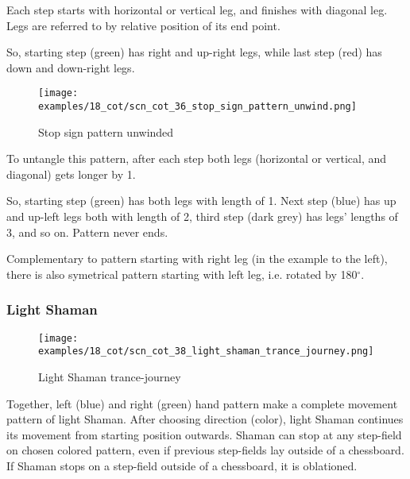 Each step starts with horizontal or vertical leg, and finishes with diagonal
leg. Legs are referred to by relative position of its end point.

So, starting step (green) has right and up-right legs, while last step (red)
has down and down-right legs.

\clearpage %

\noindent
\begin{wrapfigure}{l}{0.4\textwidth} %
\centering
\texttt{[image: examples/18\_cot/scn\_cot\_36\_stop\_sign\_pattern\_unwind.png]}
\caption{Stop sign pattern unwinded}
\label{fig:scn_cot_36_stop_sign_pattern_unwind}
\end{wrapfigure}
To untangle this pattern, after each step both legs (horizontal or vertical,
and diagonal) gets longer by 1.

So, starting step (green) has both legs with length of 1. Next step (blue)
has up and up-left legs both with length of 2, third step (dark grey) has
legs' lengths of 3, and so on. Pattern never ends.

Complementary to pattern starting with right leg (in the example to the
left), there is also symetrical pattern starting with left leg, i.e.
rotated by 180$^{\circ}$. %

\clearpage %

\subsubsection*{Light Shaman}
\label{sec:Conquest of Tlalocan/Trance-journey/Movement/Light Shaman}

\vspace*{-1.4\baselineskip}
\noindent
\begin{figure}[!h]
\texttt{[image: examples/18\_cot/scn\_cot\_38\_light\_shaman\_trance\_journey.png]}
\caption{Light Shaman trance-journey}
\label{fig:scn_cot_38_light_shaman_trance_journey}
\end{figure}

Together, left (blue) and right (green) hand pattern make a complete movement
pattern of light Shaman. After choosing direction (color), light Shaman
continues its movement from starting position outwards. Shaman can stop at
any step-field on chosen colored pattern, even if previous step-fields lay
outside of a chessboard. If Shaman stops on a step-field outside of a
chessboard, it is oblationed.

